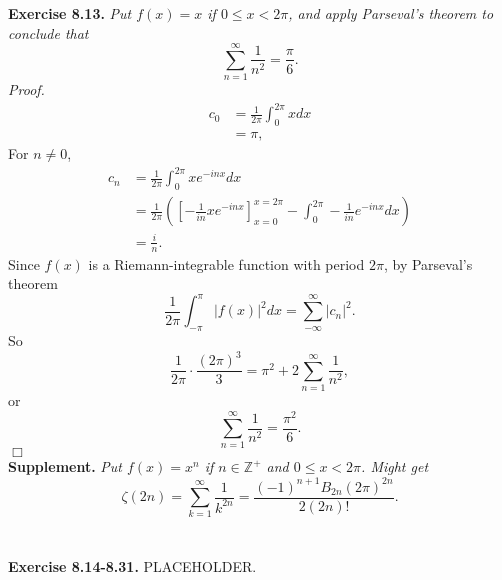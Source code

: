 \documentclass{article}
\begin{document}
\textbf{Exercise 8.13.}
\emph{Put $f(x) = x$ if $0 \leq x < 2 \pi$, and apply Parseval's theorem to conclude that
$$\sum_{n = 1}^{\infty} \frac{1}{n^2} = \frac{\pi}{6}.$$}
\emph{Proof.}
\begin{align*}
c_0
&= \frac{1}{2 \pi} \int_{0}^{2 \pi} x dx \\
&= \pi,
\end{align*}
For $n \neq 0$,
\begin{align*}
c_n
&= \frac{1}{2 \pi} \int_{0}^{2 \pi} x e^{-inx} dx \\
&= \frac{1}{2 \pi} \left(
\left[ - \frac{1}{i n} x e^{-inx} \right]_{x = 0}^{x = 2 \pi}
- \int_{0}^{2 \pi} - \frac{1}{i n} e^{-inx} dx \right) \\
&= \frac{i}{n}.
\end{align*}
Since $f(x)$ is a Riemann-integrable function with period $2 \pi$,
by Parseval's theorem
$$\frac{1}{2 \pi} \int_{-\pi}^\pi |f(x)|^2 dx = \sum_{-\infty}^{\infty} |c_n|^2.$$
So
$$\frac{1}{2 \pi} \cdot \frac{(2 \pi)^3}{3}
= \pi^2 + 2 \sum_{n = 1}^{\infty} \frac{1}{n^2}, $$
or
$$\sum_{n = 1}^{\infty} \frac{1}{n^2}
= \frac{\pi^2}{6}.$$
$\Box$ \\



\textbf{Supplement.} \emph{
Put $f(x) = x^n$ if $n \in \mathbb{Z}^+$ and $0 \leq x < 2 \pi$.
Might get
\[
  \zeta(2n)
  = \sum_{k = 1}^{\infty} \frac{1}{k^{2n}}
  = \frac{(-1)^{n+1} B_{2n} (2\pi)^{2n}}{2(2n)!}.
\]} \\\\






\textbf{Exercise 8.14-8.31.}
PLACEHOLDER. \\\\



\end{document}
